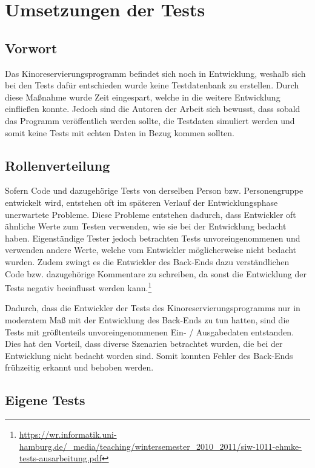 \section{Umsetzungen der Tests}

\subsection{Vorwort}

Das Kinoreservierungsprogramm befindet sich noch in Entwicklung, weshalb sich bei den Tests dafür entschieden wurde keine Testdatenbank zu erstellen.
Durch diese Maßnahme wurde Zeit eingespart, welche in die weitere Entwicklung einfließen konnte.
Jedoch sind die Autoren der Arbeit sich bewusst, dass sobald das Programm veröffentlich werden sollte, die Testdaten simuliert werden und somit keine Tests mit echten Daten in Bezug kommen sollten.

\subsection{Rollenverteilung}

Sofern Code und dazugehörige Tests von derselben Person bzw. Personengruppe entwickelt wird, entstehen oft im späteren Verlauf der Entwicklungsphase unerwartete Probleme. Diese Probleme entstehen dadurch, dass Entwickler oft ähnliche Werte zum Testen verwenden, wie sie bei der Entwicklung bedacht haben.
Eigenständige Tester jedoch betrachten Tests unvoreingenommenen und verwenden andere Werte, welche vom Entwickler möglicherweise nicht bedacht wurden.
Zudem zwingt es die Entwickler des Back-Ends dazu verständlichen Code bzw. dazugehörige Kommentare zu schreiben, da sonst die Entwicklung der Tests negativ beeinflusst werden kann.\footnote{\url{https://wr.informatik.uni-hamburg.de/_media/teaching/wintersemester_2010_2011/siw-1011-ehmke-tests-ausarbeitung.pdf}}

Dadurch, dass die Entwickler der Tests des Kinoreservierungsprogramms nur in moderatem Maß mit der Entwicklung des Back-Ends zu tun hatten, sind die Tests mit größtenteils unvoreingenommenen Ein- / Ausgabedaten entstanden.
Dies hat den Vorteil, dass diverse Szenarien betrachtet wurden, die bei der Entwicklung nicht bedacht worden sind.
Somit konnten Fehler des Back-Ends frühzeitig erkannt und behoben werden.


\subsection{Eigene Tests}

